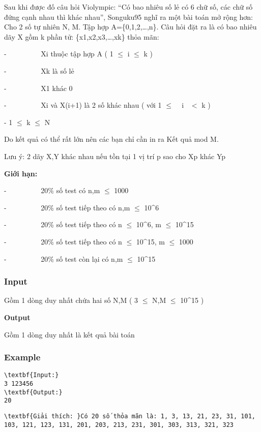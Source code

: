 



   Sau khi được đố câu hỏi Violympic: “Có bao nhiêu số lẻ có 6 chữ số, các chữ số đứng cạnh nhau thì khác nhau”, Songuku95 nghĩ ra một bài toán mở rộng hơn:   
\\   Cho 2 số tự nhiên N, M. Tập hợp A=\{0,1,2,…,n\}. Câu hỏi đặt ra là có bao nhiêu dãy X gồm k phần tử: \{x1,x2,x3,…,xk\} thỏa mãn:  

   -          Xi thuộc tập hợp A ( 1  $\le$  i  $\le$  k )  

   -          Xk là số lẻ  

   -          X1 khác 0  

   -          Xi và X(i+1) là 2 số khác nhau ( với 1  $\le$   i  $<$ k )   

    -      1  $\le$  k  $\le$  N  

   Do kết quả có thể rất lớn nên các bạn chỉ cần in ra Kết quả mod M.  

   Lưu ý: 2 dãy X,Y khác nhau nếu tồn tại 1 vị trí p sao cho Xp khác Yp  

\textbf{    Giới hạn:   }

   -          20\% số test có n,m  $\le$  1000  

   -          20\% số test tiếp theo có n,m  $\le$  10\textasciicircum6  

   -          20\% số test tiếp theo có n  $\le$  10\textasciicircum6, m  $\le$  10\textasciicircum15  

   -          20\% số test tiếp theo có n  $\le$  10\textasciicircum15, m  $\le$  1000  

   -          20\% số test còn lại có n,m  $\le$  10\textasciicircum15  

\subsubsection{   Input  }

   Gồm 1 dòng duy nhất chứa hai số N,M ( 3  $\le$  N,M  $\le$  10\textasciicircum15 )  

\textbf{     Output    }

   Gồm 1 dòng duy nhất là kết quả bài toán  



\subsubsection{   Example  }
\begin{verbatim}
\textbf{Input:}
3 123456
\textbf{Output:}
20\end{verbatim}
\begin{verbatim}
\textbf{Giải thích: }Có 20 số thỏa mãn là: 1, 3, 13, 21, 23, 31, 101, 103, 121, 123, 131, 201, 203, 213, 231, 301, 303, 313, 321, 323\end{verbatim}
